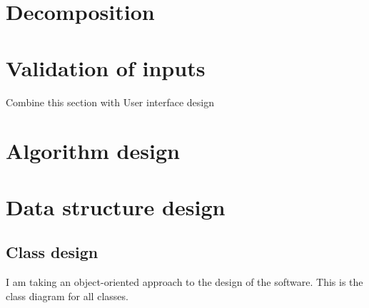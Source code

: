 \documentclass[a4paper]{report}
\begin{document}
\section{Decomposition}
\section{Validation of inputs}
Combine this section with User interface design
\section{Algorithm design}
\section{Data structure design}

\subsection{Class design}

I am taking an object-oriented approach to the design of the software. This is the class diagram for all classes.
\end{document}
